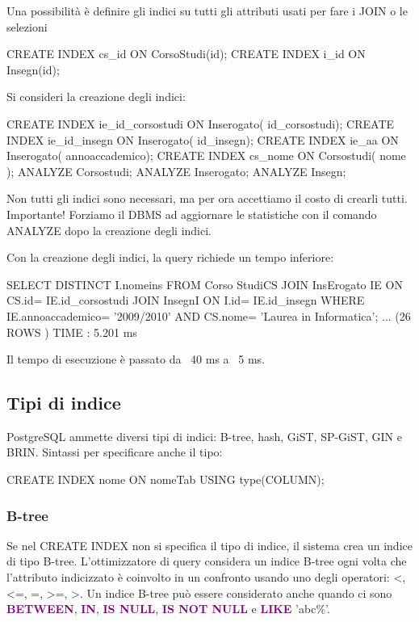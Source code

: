 Una possibilità è definire gli indici su tutti gli attributi usati per fare i JOIN o le selezioni

\begin{codiceSQL}
CREATE INDEX cs_id ON CorsoStudi(id);
CREATE INDEX i_id ON Insegn(id);
\end{codiceSQL}


Si consideri la creazione degli indici:
\begin{codiceSQL}
CREATE INDEX ie_id_corsostudi ON Inserogato( id_corsostudi);
CREATE INDEX ie_id_insegn ON Inserogato( id_insegn);
CREATE INDEX ie_aa ON Inserogato( annoaccademico);
CREATE INDEX cs_nome ON Corsostudi( nome );
ANALYZE Corsostudi;
ANALYZE Inserogato;
ANALYZE Insegn;
\end{codiceSQL}

Non tutti gli indici sono necessari, ma per ora accettiamo il costo di crearli tutti.
Importante! Forziamo il DBMS ad aggiornare le statistiche con il comando ANALYZE dopo la creazione degli indici.


Con la creazione degli indici, la query richiede un tempo inferiore:
\begin{codiceSQL}
SELECT DISTINCT I.nomeins
FROM Corso StudiCS
JOIN InsErogato IE ON CS.id= IE.id_corsostudi
JOIN InsegnI ON I.id= IE.id_insegn
WHERE IE.annoaccademico= '2009/2010'
AND CS.nome= 'Laurea in Informatica';
...
(26 ROWS )
TIME : 5.201 ms
\end{codiceSQL}

Il tempo di esecuzione è passato da ~40 ms a ~5 ms.

\subsection{Tipi di indice}
PostgreSQL ammette diversi tipi di indici: B-tree, hash, GiST, SP-GiST, GIN e BRIN.
Sintassi per specificare anche il tipo:
\begin{codiceSQL}
CREATE INDEX nome ON nomeTab USING type(COLUMN);
\end{codiceSQL}

\subsubsection{B-tree}
Se nel CREATE INDEX non si specifica il tipo di indice, il sistema crea un indice di tipo B-tree.
L’ottimizzatore di query considera un indice B-tree ogni volta che l’attributo indicizzato è coinvolto in un confronto usando uno degli operatori: <, <=, =, >=, >.
Un indice B-tree può essere considerato anche quando ci sono \textcolor{purple}{\textbf{BETWEEN}}, \textcolor{purple}{\textbf{IN}}, \textcolor{purple}{\textbf{IS NULL}}, \textcolor{purple}{\textbf{IS NOT NULL}} e \textcolor{purple}{\textbf{LIKE}} 'abc\%'.


